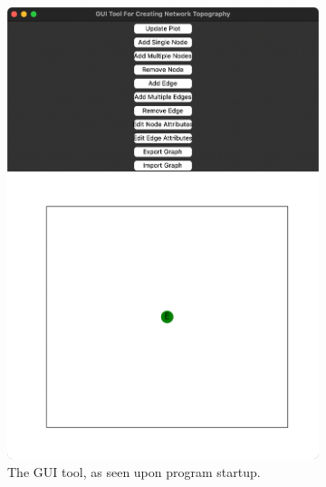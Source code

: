 \begin{figure}
    \centering
    \begin{subfigure}{0.49\linewidth}
        \centering
        \captionsetup{width=1\linewidth}
        \includegraphics[width=\linewidth]{Screenshots/initial_startup_GUI_tool.png}
        \caption{
            The GUI tool, as seen upon program startup.
        }
        \label{fig:ss:initial_startup_GUI_tool}
    \end{subfigure}
    \begin{subfigure}{0.49\linewidth}
        \centering
        \captionsetup{width=1\linewidth}

\end{subfigure}
\end{figure}
